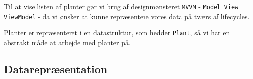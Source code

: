 Til at vise listen af planter gør vi brug af designmønsteret \texttt{MVVM} - \texttt{Model View ViewModel} - da vi ønsker at kunne repræsentere vores data på tværs af lifecycles.

Planter er repræsenteret i en datastruktur, som hedder \texttt{Plant}, så vi har en abstrakt måde at arbejde med planter på.

\subsection{Datarepræsentation}


